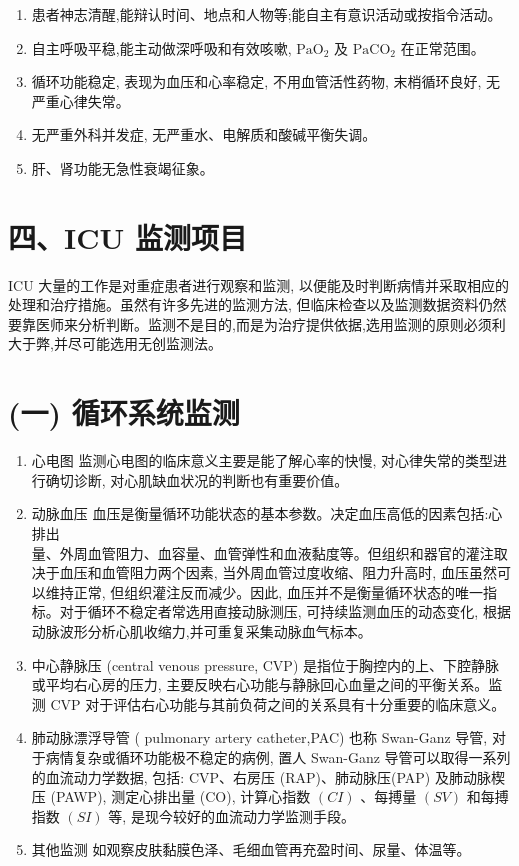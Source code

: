 \documentclass[10pt]{article}
\begin{document}
\begin{enumerate}
  \item 患者神志清醒,能辩认时间、地点和人物等;能自主有意识活动或按指令活动。

  \item 自主呼吸平稳,能主动做深呼吸和有效咳嗽, $\mathrm{PaO}_{2}$ 及 $\mathrm{PaCO}_{2}$ 在正常范围。

  \item 循环功能稳定, 表现为血压和心率稳定, 不用血管活性药物, 末梢循环良好, 无严重心律失常。

  \item 无严重外科并发症, 无严重水、电解质和酸碱平衡失调。

  \item 肝、肾功能无急性衰竭征象。

\end{enumerate}

\section*{四、ICU 监测项目}
ICU 大量的工作是对重症患者进行观察和监测, 以便能及时判断病情并采取相应的处理和治疗措施。虽然有许多先进的监测方法, 但临床检查以及监测数据资料仍然要靠医师来分析判断。监测不是目的,而是为治疗提供依据,选用监测的原则必须利大于弊,并尽可能选用无创监测法。

\section*{(一) 循环系统监测}
\begin{enumerate}
  \item 心电图 监测心电图的临床意义主要是能了解心率的快慢, 对心律失常的类型进行确切诊断, 对心肌缺血状况的判断也有重要价值。

  \item 动脉血压 血压是衡量循环功能状态的基本参数。决定血压高低的因素包括:心排出\\
量、外周血管阻力、血容量、血管弹性和血液黏度等。但组织和器官的灌注取决于血压和血管阻力两个因素, 当外周血管过度收缩、阻力升高时, 血压虽然可以维持正常, 但组织灌注反而减少。因此, 血压并不是衡量循环状态的唯一指标。对于循环不稳定者常选用直接动脉测压, 可持续监测血压的动态变化, 根据动脉波形分析心肌收缩力,并可重复采集动脉血气标本。

  \item 中心静脉压 (central venous pressure, CVP) 是指位于胸控内的上、下腔静脉或平均右心房的压力, 主要反映右心功能与静脉回心血量之间的平衡关系。监测 CVP 对于评估右心功能与其前负荷之间的关系具有十分重要的临床意义。

  \item 肺动脉漂浮导管 ( pulmonary artery catheter,PAC) 也称 Swan-Ganz 导管, 对于病情复杂或循环功能极不稳定的病例, 置人 Swan-Ganz 导管可以取得一系列的血流动力学数据, 包括: CVP、右房压 (RAP)、肺动脉压(PAP) 及肺动脉楔压 (PAWP), 测定心排出量 (CO), 计算心指数 $(C I)$ 、每搏量 $(S V)$ 和每搏指数 $(S I)$ 等, 是现今较好的血流动力学监测手段。

  \item 其他监测 如观察皮肤黏膜色泽、毛细血管再充盈时间、尿量、体温等。

\end{enumerate}
\end{document}
